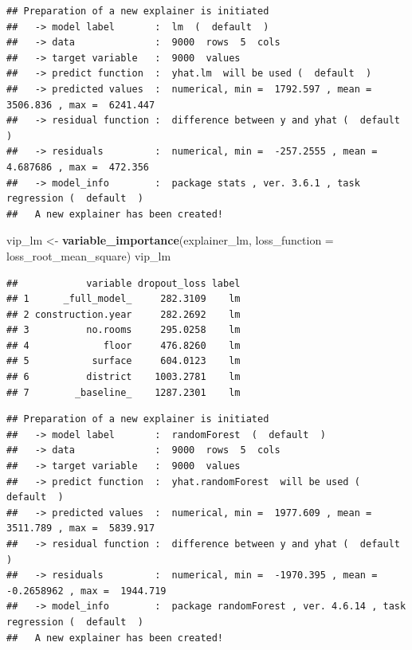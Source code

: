 \documentclass[12pt,]{krantz}
\newenvironment{Shaded}{\begin{snugshade}}{\end{snugshade}}
\newcommand{\DataTypeTok}[1]{\textcolor[rgb]{0.13,0.29,0.53}{#1}}
\newcommand{\DecValTok}[1]{\textcolor[rgb]{0.00,0.00,0.81}{#1}}
\newcommand{\KeywordTok}[1]{\textcolor[rgb]{0.13,0.29,0.53}{\textbf{#1}}}
\newcommand{\NormalTok}[1]{#1}
\newcommand{\OperatorTok}[1]{\textcolor[rgb]{0.81,0.36,0.00}{\textbf{#1}}}
\newcommand{\OtherTok}[1]{\textcolor[rgb]{0.56,0.35,0.01}{#1}}
\newcommand{\StringTok}[1]{\textcolor[rgb]{0.31,0.60,0.02}{#1}}
\begin{document}
\begin{verbatim}
## Preparation of a new explainer is initiated
##   -> model label       :  lm  (  default  )
##   -> data              :  9000  rows  5  cols 
##   -> target variable   :  9000  values 
##   -> predict function  :  yhat.lm  will be used (  default  )
##   -> predicted values  :  numerical, min =  1792.597 , mean =  3506.836 , max =  6241.447  
##   -> residual function :  difference between y and yhat (  default  )
##   -> residuals         :  numerical, min =  -257.2555 , mean =  4.687686 , max =  472.356  
##   -> model_info        :  package stats , ver. 3.6.1 , task regression (  default  ) 
##   A new explainer has been created!
\end{verbatim}

\begin{Shaded}
\begin{Highlighting}[]
\NormalTok{vip_lm <-}\StringTok{ }\KeywordTok{variable_importance}\NormalTok{(explainer_lm, }
            \DataTypeTok{loss_function =}\NormalTok{ loss_root_mean_square)}
\NormalTok{vip_lm}
\end{Highlighting}
\end{Shaded}

\begin{verbatim}
##            variable dropout_loss label
## 1      _full_model_     282.3109    lm
## 2 construction.year     282.2692    lm
## 3          no.rooms     295.0258    lm
## 4             floor     476.8260    lm
## 5           surface     604.0123    lm
## 6          district    1003.2781    lm
## 7        _baseline_    1287.2301    lm
\end{verbatim}

\begin{Shaded}
\end{Shaded}

\begin{verbatim}
## Preparation of a new explainer is initiated
##   -> model label       :  randomForest  (  default  )
##   -> data              :  9000  rows  5  cols 
##   -> target variable   :  9000  values 
##   -> predict function  :  yhat.randomForest  will be used (  default  )
##   -> predicted values  :  numerical, min =  1977.609 , mean =  3511.789 , max =  5839.917  
##   -> residual function :  difference between y and yhat (  default  )
##   -> residuals         :  numerical, min =  -1970.395 , mean =  -0.2658962 , max =  1944.719  
##   -> model_info        :  package randomForest , ver. 4.6.14 , task regression (  default  ) 
##   A new explainer has been created!
\end{verbatim}
\end{document}
